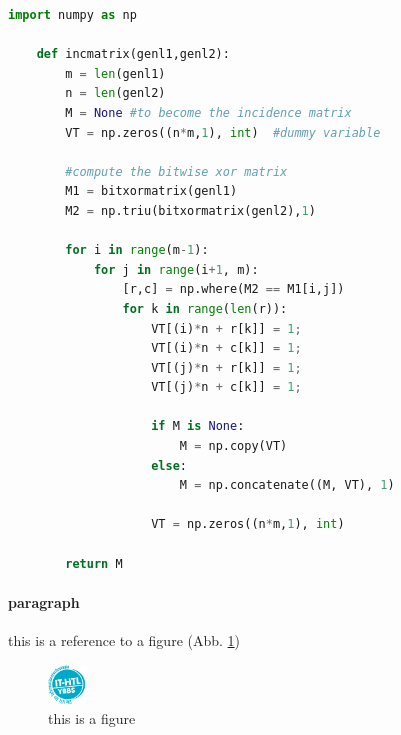 \documentclass[11pt,a4paper]{report}
\begin{document}
    \begin{lstlisting}[language=Python, caption=Python example, label=example]
    import numpy as np

    def incmatrix(genl1,genl2):
        m = len(genl1)
        n = len(genl2)
        M = None #to become the incidence matrix
        VT = np.zeros((n*m,1), int)  #dummy variable

        #compute the bitwise xor matrix
        M1 = bitxormatrix(genl1)
        M2 = np.triu(bitxormatrix(genl2),1)

        for i in range(m-1):
            for j in range(i+1, m):
                [r,c] = np.where(M2 == M1[i,j])
                for k in range(len(r)):
                    VT[(i)*n + r[k]] = 1;
                    VT[(i)*n + c[k]] = 1;
                    VT[(j)*n + r[k]] = 1;
                    VT[(j)*n + c[k]] = 1;

                    if M is None:
                        M = np.copy(VT)
                    else:
                        M = np.concatenate((M, VT), 1)

                    VT = np.zeros((n*m,1), int)

        return M
    \end{lstlisting}


    \paragraph{paragraph}
    this is a reference to a figure (Abb. \ref{fig:demo-figure})

    \begin{figure}[h]
        \centering
        \includegraphics[width=1cm]{LogoITHTL_white.png}
        \caption{this is a figure}
        \label{fig:demo-figure}
    \end{figure}
\end{document}

